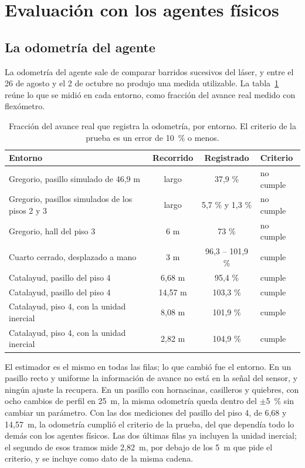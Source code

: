 \section{Evaluación con los agentes físicos}
\label{sec:res-hw}

\subsection{La odometría del agente}

La odometría del agente sale de comparar barridos sucesivos del láser, y entre el 26 de agosto y el 2 de octubre no produjo una medida utilizable. La tabla~\ref{tab:odometria}
reúne lo que se midió en cada entorno, como fracción del avance real medido con
flexómetro.

\begin{table}[H]
  \centering\small
  \caption{Fracción del avance real que registra la odometría, por entorno. El
    criterio de la prueba es un error de 10~\% o menos.}
  \label{tab:odometria}
  \begin{tabular}{@{}p{}ccl@{}}
    \toprule
    \textbf{Entorno} & \textbf{Recorrido} & \textbf{Registrado} & \textbf{Criterio} \\ \midrule
    Gregorio, pasillo simulado de 46,9 m & largo & 37,9 \% & no cumple \\
    Gregorio, pasillos simulados de los pisos 2 y 3 & largo & 5,7 \% y 1,3 \% & no cumple \\
    Gregorio, hall del piso 3 & 6 m & 73 \% & no cumple \\
    Cuarto cerrado, desplazado a mano & 3 m & 96,3 -- 101,9 \% & cumple \\
    Catalayud, pasillo del piso 4 & 6,68 m & 95,4 \% & cumple \\
    Catalayud, pasillo del piso 4 & 14,57 m & 103,3 \% & cumple \\
    Catalayud, piso 4, con la unidad inercial & 8,08 m & 101,9 \% & cumple \\
    Catalayud, piso 4, con la unidad inercial & 2,82 m & 104,9 \% & cumple \\ \bottomrule
  \end{tabular}
\end{table}

El estimador es el mismo en todas las filas; lo que cambió fue el entorno. En un
pasillo recto y uniforme la información de avance no está en la señal del sensor, y ningún ajuste la recupera. En un
pasillo con hornacinas, casilleros y quiebres, con ocho cambios de perfil en
25~m, la misma odometría queda dentro del $\pm$5~\% sin cambiar un parámetro. Con
las dos mediciones del pasillo del piso 4, de 6,68 y 14,57~m, la odometría cumplió el criterio de la prueba, del que dependía todo lo demás con los agentes físicos. Las dos últimas filas ya incluyen la unidad inercial; el segundo de esos tramos mide 2,82~m, por debajo de los
5~m que pide el criterio, y se incluye como dato de la misma cadena.

